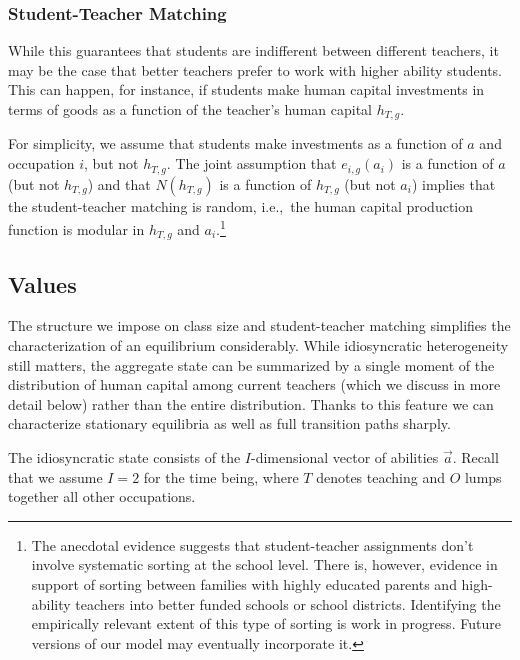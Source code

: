 \documentclass[onehalfspacing,11pt]{article}
\begin{document}
	\subsubsection{Student-Teacher Matching}
	While this guarantees that students are indifferent between different teachers, it may be the case that better teachers prefer to work with higher ability students. This can happen, for instance, if students make human capital investments in terms of goods as a function of the teacher's human capital $h_{T,g}$. 
	
	For simplicity, we assume that students make investments as a function of $a$ and occupation $i$, but not $h_{T,g}$. The joint assumption that $e_{i,g}(a_i)$ is a function of $a$ (but not $h_{T,g}$) and that $N(h_{T,g})$ is a function of $h_{T,g}$ (but not $a_i$) implies that the student-teacher matching is random, i.e.,~the human capital production function is modular in $h_{T,g}$ and $a_i$.\footnote{The anecdotal evidence suggests that student-teacher assignments don't involve systematic sorting at the school level. There is, however, evidence in support of sorting between families with highly educated parents and high-ability teachers into better funded schools or school districts. Identifying the empirically relevant extent of this type of sorting is work in progress. Future versions of our model may eventually incorporate it.}
	
	\subsection{Values}
	The structure we impose on class size and student-teacher matching simplifies the characterization of an equilibrium considerably. While idiosyncratic heterogeneity still matters, the aggregate state can be summarized by a single moment of the distribution of human capital among current teachers (which we discuss in more detail below) rather than the entire distribution. Thanks to this feature we can characterize stationary equilibria as well as full transition paths sharply.
	
	The idiosyncratic state consists of the $I$-dimensional vector of abilities $\vec{a}$. Recall that we assume $I=2$ for the time being, where $T$ denotes teaching and $O$ lumps together all other occupations.
	
\end{document}
